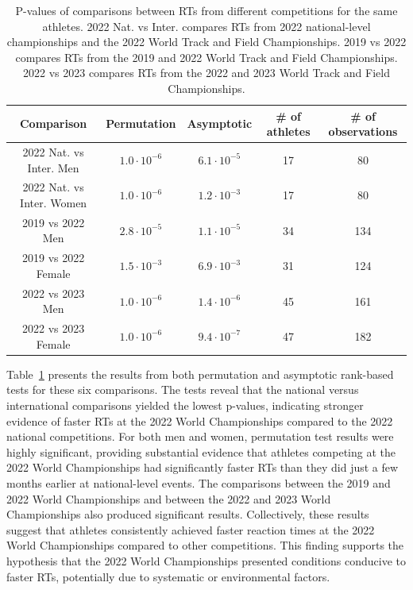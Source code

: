 \documentclass[12pt, letterpaper]{article}
\begin{document}
\begin{table}
  \centering
  \caption{P-values of comparisons between
    RTs from different competitions for the same athletes.
    2022 Nat. vs Inter. compares RTs from 2022 national-level
    championships and the 2022 World Track and Field Championships. 2019
    vs 2022 compares RTs from the 2019 and 2022 World Track and
    Field Championships. 2022 vs 2023 compares RTs from the
    2022 and 2023 World Track and Field Championships.}
  \begin{tabular}{c c c c c}
   \toprule
   Comparison & Permutation & Asymptotic & \# of athletes & \# of observations  \\
   \midrule
   2022 Nat. vs Inter. Men & $1.0 \cdot 10^{-6}$ & $ 6.1 \cdot 10^{-5}$ & 17 & 80 \\
   2022 Nat. vs Inter. Women & $1.0 \cdot 10^{-6}$ & $ 1.2 \cdot 10^{-3}$ & 17 & 80 \\[1ex]
   2019 vs 2022 Men & $2.8 \cdot 10^{-5}$ & $1.1 \cdot 10^{-5}$ & 34 & 134 \\
   2019 vs 2022 Female & $ 1.5 \cdot 10^{-3}$ & $6.9 \cdot 10^{-3}$ & 31 & 124 \\[1ex]
   2022 vs 2023 Men & $1.0 \cdot 10^{-6}$ & $1.4 \cdot 10^{-6}$ & 45 & 161 \\
   2022 vs 2023 Female & $1.0 \cdot 10^{-6}$ & $9.4 \cdot 10^{-7}$ & 47 & 182 \\
   \bottomrule
  \end{tabular}
  \label{tab:Clusrankresults}
\end{table}



Table~\ref{tab:Clusrankresults} presents the results from both permutation
and asymptotic rank-based tests for these six comparisons. The tests reveal
that the national versus international comparisons yielded the lowest
p-values, indicating stronger evidence of faster RTs at the
2022 World Championships compared to the 2022 national competitions. For
both men and women, permutation test results were highly significant,
providing substantial evidence that athletes competing at the 2022 World
Championships had significantly faster RTs than they did just
a few months earlier at national-level events. The comparisons between the
2019 and 2022 World Championships and between the 2022 and 2023 World
Championships also produced significant results. Collectively,
these results suggest that athletes consistently achieved faster reaction
times at the 2022 World Championships compared to other competitions. This
finding supports the hypothesis that the 2022 World Championships presented
conditions conducive to faster RTs, potentially due to systematic
or environmental factors.
\end{document}
